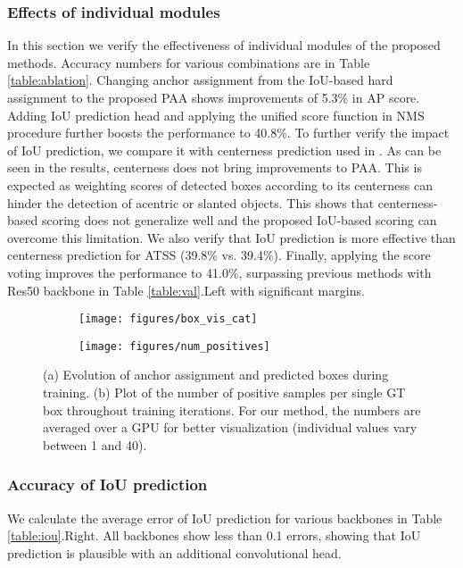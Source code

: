 \documentclass[runningheads]{llncs}
\begin{document}
\subsubsection{Effects of individual modules}
In this section we verify the effectiveness of individual modules of the proposed methods. Accuracy numbers for various combinations are in Table \ref{table:ablation}. Changing anchor assignment from the IoU-based hard assignment to the proposed PAA shows improvements of 5.3\% in AP score. Adding IoU prediction head and applying the unified score function in NMS procedure further boosts the performance to 40.8\%. To further verify the impact of IoU prediction, we compare it with centerness prediction used in \cite{fcos, atss}. As can be seen in the results, centerness does not bring improvements to PAA. This is expected as weighting scores of detected boxes according to its centerness can hinder the detection of acentric or slanted objects. This shows that centerness-based scoring does not generalize well and the proposed IoU-based scoring can overcome this limitation. We also verify that IoU prediction is more effective than centerness prediction for ATSS\cite{atss} (39.8\% vs. 39.4\%).  Finally, applying the score voting improves the performance to 41.0\%, surpassing previous methods with Res50 backbone in Table \ref{table:val}.Left with significant margins.

\begin{figure}[t]
    \begin{subfigure}{.65\textwidth}
		\texttt{[image: figures/box\_vis\_cat]}
	    \caption{}
	    \label{fig_box_vis}
    \end{subfigure}
    \begin{subfigure}{.34\textwidth}
		\texttt{[image: figures/num\_positives]}
		\caption{}
	    \label{fig_numpos}
    \end{subfigure}
\caption{(a) Evolution of anchor assignment and predicted boxes during training. (b) Plot of the number of positive samples per single GT box throughout training iterations. For our method, the numbers are averaged over a GPU for better visualization (individual values vary between 1 and 40).}
\end{figure}

\subsubsection{Accuracy of IoU prediction}
We calculate the average error of IoU prediction for various backbones in Table \ref{table:iou}.Right. All backbones show less than 0.1 errors, showing that IoU prediction is plausible with an additional convolutional head.
\end{document}
